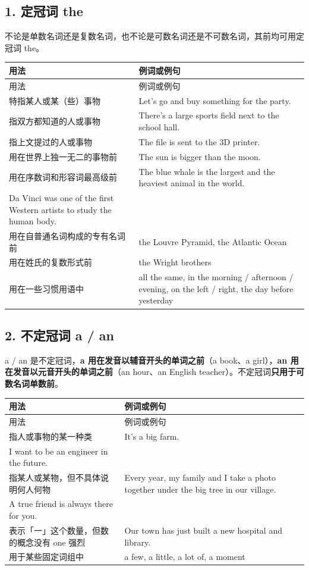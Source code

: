 \documentclass[11pt,a4paper]{ctexart}
\begin{document}
\subsection*{1. 定冠词 the}

不论是单数名词还是复数名词，也不论是可数名词还是不可数名词，其前均可用定冠词 the。

{\footnotesize
\begin{longtable}{p{6.70cm}p{6.70cm}}
\hline
用法 & 例词或例句 \\
\hline
\endfirsthead
\hline
用法 & 例词或例句 \\
\hline
\endhead
\hline
\endfoot
特指某人或某（些）事物 & Let’s go and buy something for the party. \\
指双方都知道的人或事物 & There’s a large sports field next to the school hall. \\
指上文提过的人或事物 & The file is sent to the 3D printer. \\
用在世界上独一无二的事物前 & The sun is bigger than the moon. \\
用在序数词和形容词最高级前 & The blue whale is the largest and the heaviest animal in the world.\\ Da Vinci was one of the first Western artists to study the human body. \\
用在自普通名词构成的专有名词前 & the Louvre Pyramid, the Atlantic Ocean \\
用在姓氏的复数形式前 & the Wright brothers \\
用在一些习惯用语中 & all the same, in the morning / afternoon / evening, on the left / right, the day before yesterday \\
\end{longtable}
}

\subsection*{2. 不定冠词 a / an}

a / an 是不定冠词，\textbf{a 用在发音以辅音开头的单词之前}（a book、a girl），\textbf{an 用在发音以元音开头的单词之前}（an hour、an English teacher）。不定冠词\textbf{只用于可数名词单数前}。

{\footnotesize
\begin{longtable}{p{6.70cm}p{6.70cm}}
\hline
用法 & 例词或例句 \\
\hline
\endfirsthead
\hline
用法 & 例词或例句 \\
\hline
\endhead
\hline
\endfoot
指人或事物的某一种类 & It’s a big farm.\\ I want to be an engineer in the future. \\
指某人或某物，但不具体说明何人何物 & Every year, my family and I take a photo together under the big tree in our village.\\ A true friend is always there for you. \\
表示「一」这个数量，但数的概念没有 one 强烈 & Our town has just built a new hospital and library. \\
用于某些固定词组中 & a few, a little, a lot of, a moment \\
\end{longtable}
}
\end{document}
